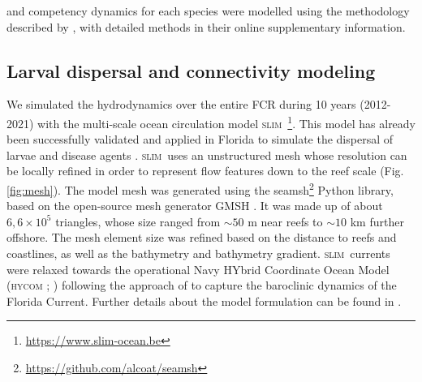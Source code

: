\documentclass[preprint,12pt,authoryear]{elsarticle}
\newcommand{\hycom}{\textsc{hycom} }
\newcommand{\slim}{\textsc{slim}\ }
\begin{document}
and competency dynamics for each species were modelled using the methodology described by \cite{figueiredo2022global}, with detailed methods in their online supplementary information.
	
	\subsection*{Larval dispersal and connectivity modeling}
	
	We simulated the hydrodynamics over the entire FCR during 10 years (2012-2021) with the multi-scale ocean circulation model \slim\footnote{\href{ https://www.slim-ocean.be}{https://www.slim-ocean.be}}. This model has already been successfully validated and applied in Florida to simulate the dispersal of larvae and disease agents \citep{frys2020fine,dobbelaere2020coupled,dobbelaere2022connecting,king2023larval}. \slim uses an unstructured mesh whose resolution can be locally refined in order to represent flow features down to the reef scale (Fig. \ref{fig:mesh}). The model mesh was generated using the seamsh\footnote{\href{https://github.com/alcoat/seamsh}{https://github.com/alcoat/seamsh}} Python library, based on the open-source mesh generator GMSH \citep{geuzaine2009gmsh}. It was made up of about $6,6\times 10^5$ triangles, whose size ranged from $\sim 50$ m near reefs to $\sim 10$ km further offshore. The mesh element size was refined based on the distance to reefs and coastlines, as well as the bathymetry and bathymetry gradient. \slim currents were relaxed towards the operational Navy HYbrid Coordinate Ocean Model (\hycom; \citealp{chassignet2007hycom}) following the approach of \citep{dobbelaere2022impacts} to capture the baroclinic dynamics of the Florida Current. Further details about the model formulation can be found in \citep{frys2020fine}.
	
\end{document}
